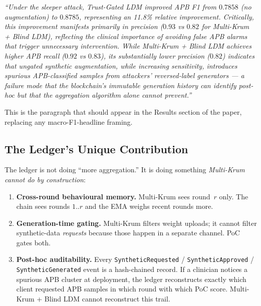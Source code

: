 \documentclass[11pt,a4paper]{article}
\begin{document}
\begin{claimbox}
\textit{``Under the sleeper attack, Trust-Gated LDM improved APB F1 from
$0.7858$ (no augmentation) to $0.8785$, representing an 11.8\% relative
improvement. Critically, this improvement manifests primarily in
precision ($0.93$ vs $0.82$ for Multi-Krum + Blind LDM), reflecting the
clinical importance of avoiding false APB alarms that trigger unnecessary
intervention. While Multi-Krum + Blind LDM achieves higher APB recall
($0.92$ vs $0.83$), its substantially lower precision ($0.82$) indicates
that ungated synthetic augmentation, while increasing sensitivity,
introduces spurious APB-classified samples from attackers' reversed-label
generators --- a failure mode that the blockchain's immutable generation
history can identify post-hoc but that the aggregation algorithm alone
cannot prevent.''}

This is the paragraph that should appear in the Results section of the
paper, replacing any macro-F1-headline framing.
\end{claimbox}

\subsection{The Ledger's Unique Contribution}

The ledger is not doing ``more aggregation.'' It is doing something
\textit{Multi-Krum cannot do by construction}:

\begin{enumerate}[nosep]
    \item \textbf{Cross-round behavioural memory.} Multi-Krum sees round~$r$
          only. The chain sees rounds $1..r$ and the EMA weighs recent
          rounds more.
    \item \textbf{Generation-time gating.} Multi-Krum filters weight
          uploads; it cannot filter synthetic-data \textit{requests}
          because those happen in a separate channel. PoC gates both.
    \item \textbf{Post-hoc auditability.} Every
          \texttt{SyntheticRequested} / \texttt{SyntheticApproved} /
          \texttt{SyntheticGenerated} event is a hash-chained record. If a
          clinician notices a spurious APB cluster at deployment, the
          ledger reconstructs exactly which client requested APB samples
          in which round with which PoC score. Multi-Krum + Blind LDM
          cannot reconstruct this trail.
\end{enumerate}
\end{document}
